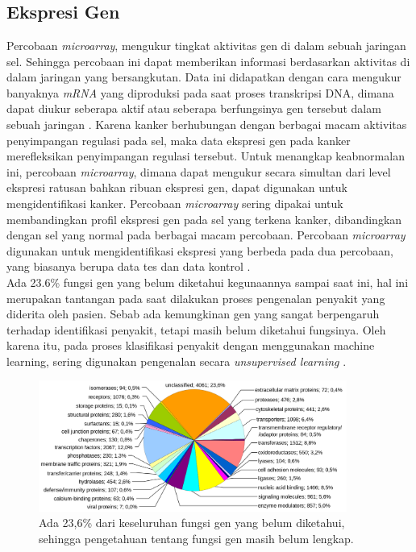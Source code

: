 \chapter{\babDua}

\section{Ekspresi Gen}
Percobaan \textit{microarray}, mengukur tingkat aktivitas gen di dalam sebuah jaringan sel. Sehingga percobaan ini dapat memberikan informasi berdasarkan aktivitas di dalam jaringan yang bersangkutan. Data ini didapatkan dengan cara mengukur banyaknya \textit{mRNA} yang diproduksi pada saat proses transkripsi DNA, dimana dapat diukur seberapa aktif atau seberapa berfungsinya gen tersebut dalam sebuah jaringan \citep{elloumi2011algorithms}. Karena kanker berhubungan dengan berbagai macam aktivitas penyimpangan regulasi pada sel, maka data ekspresi gen pada kanker merefleksikan penyimpangan regulasi tersebut. Untuk menangkap keabnormalan ini, percobaan \textit{microarray}, dimana dapat mengukur secara simultan dari level ekspresi ratusan bahkan ribuan ekspresi gen, dapat digunakan untuk mengidentifikasi kanker. Percobaan \textit{microarray} sering dipakai untuk membandingkan profil ekspresi gen pada sel yang terkena kanker, dibandingkan dengan sel yang normal pada berbagai macam percobaan. Percobaan \textit{microarray} digunakan untuk mengidentifikasi ekspresi yang berbeda pada dua percobaan, yang biasanya berupa data tes dan data kontrol \citep{elloumi2011algorithms}. \\
Ada 23.6\% fungsi gen yang belum diketahui kegunaannya sampai saat ini, hal ini merupakan tantangan pada saat dilakukan proses pengenalan penyakit yang diderita oleh pasien. Sebab ada kemungkinan gen yang sangat berpengaruh terhadap identifikasi penyakit, tetapi masih belum diketahui fungsinya. Oleh karena itu, pada proses klasifikasi penyakit dengan menggunakan machine learning, sering digunakan pengenalan secara \textit{unsupervised learning} \citep{haggstrom2014diagram}. \\
\begin{figure}
	\centering
	\includegraphics[width=0.90\textwidth]
		{pics/gbr2_1.png}
	\caption{Ada 23,6\% dari keseluruhan fungsi gen yang belum diketahui, sehingga pengetahuan tentang fungsi gen masih belum lengkap. \citep{haggstrom2014diagram}}
	\label{fig:gbr2.1}
\end{figure}


